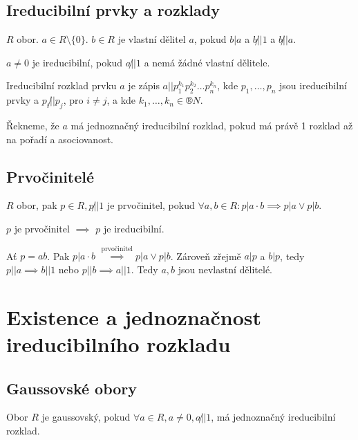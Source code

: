 \documentclass[12pt]{article}                   %
\begin{document}
    \subsection{Ireducibilní prvky a rozklady}
        \begin{definice}
            $R$ obor. $a \in R \setminus \{0\}$. $b \in R$ je vlastní dělitel $a$, pokud $b|a$ a $b \not||1$ a $b\not||a$.

            $a≠0$ je ireducibilní, pokud $a \not||1$ a nemá žádné vlastní dělitele.
        \end{definice}

        \begin{definice}
            Ireducibilní rozklad prvku $a$ je zápis $a || p_1^{k_1}p_2^{k_2}…p_n^{k_n}$, kde $p_1, …, p_n$ jsou ireducibilní prvky a $p_i \not|| p_j$, pro $i≠j$, a kde $k_1, …, k_n \in ®N$.

            Řekneme, že $a$ má jednoznačný ireducibilní rozklad, pokud má právě 1 rozklad až na pořadí a asociovanost.
        \end{definice}

    \subsection{Prvočinitelé}
        \begin{definice}[Prvočinitel]
            $R$ obor, pak $p \in R, p\not||1$ je prvočinitel, pokud $\forall a, b \in R: p|a·b \implies p|a \lor p|b$.
        \end{definice}

        \begin{pozorovani}
            $p$ je prvočinitel $\implies$ $p$ je ireducibilní.

            \begin{dukazin}
                Ať $p = ab$. Pak $p|a·b$ $\overset{\text{prvočinitel}}{\implies} p|a \lor p|b$. Zároveň zřejmě $a|p$ a $b|p$, tedy $p||a \implies b||1$ nebo $p||b \implies a||1$. Tedy $a, b$ jsou nevlastní dělitelé.
            \end{dukazin}
        \end{pozorovani}

\section{Existence a jednoznačnost ireducibilního rozkladu}
    \subsection{Gaussovské obory}
        \begin{definice}
            Obor $R$ je gaussovský, pokud $\forall a \in R, a≠0, a\not||1$, má jednoznačný ireducibilní rozklad.
        \end{definice}
\end{document}
